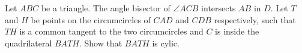 Let $ABC$ be a triangle.
The angle bisector of $\angle ACB$ intersects $AB$ in $D$.
Let $T$ and $H$ be points on the circumcircles of $CAD$ and $CDB$ respectively,
such that $TH$ is a common tangent to the two circumcircles and $C$ is inside the quadrilateral $BATH$.
Show that $BATH$ is cylic. 
